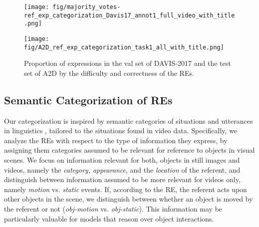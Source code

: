 \documentclass[10pt,twocolumn,letterpaper]{article}
\begin{document}
\begin{figure}[!tbp]
\centering
\begin{minipage}[t]{0.23\textwidth}

\texttt{[image: fig/majority\_votes-ref\_exp\_categorization\_Davis17\_annot1\_full\_video\_with\_title.png]}
\end{minipage}
\begin{minipage}[t]{0.23\textwidth}
\texttt{[image: fig/A2D\_ref\_exp\_categorization\_task1\_all\_with\_title.png]}
\end{minipage}
\caption{Proportion of expressions in the val set of DAVIS-2017 and the test set of A2D by the difficulty and correctness of the REs.}
  \label{fig:analysis_datasets_difficulty}
\end{figure}

\subsection{Semantic Categorization of REs}
Our categorization is inspired by semantic categories of situations and utterances in linguistics \cite{levelt89,germanet1997}, tailored to the situations found in video data. 
Specifically, we analyze the REs with respect to the type of information they express, by assigning them categories assumed to be relevant for reference to objects in visual scenes. 
We focus on information relevant for both, objects in still images and videos, namely the \textsl{category, appearance}, and the \textsl{location} of the referent, and distinguish between information assumed to be more relevant for videos only, namely \textsl{motion} vs. \textsl{static} events.  
If, according to the RE, the referent acts upon other objects in the scene, we distinguish between whether an object is moved by the referent or not (\textsl{obj-motion} vs. \textsl{obj-static}). 
This information may be particularly valuable for models that reason over object interactions. 
\end{document}
